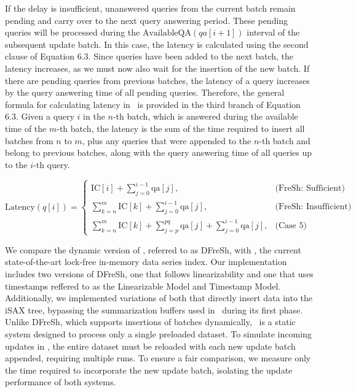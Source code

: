 If the delay is insufficient, unanswered queries from the current batch remain
pending and carry over to the next query answering period. These pending queries
will be processed during the $\text{AvailableQA}(qa[i+1])$ interval of the subsequent
update batch. In this case, the latency is calculated using the second clause of
Equation 6.3. Since queries have been added to the next batch, the latency increases,
as we must now also wait for the insertion of the new batch. 
% 
If there are pending queries from previous batches, the latency of a query increases by
the query answering time of all pending queries. Therefore, the general formula for
calculating latency in \Fresh\ is provided in the third branch of Equation 6.3.
Given a query $i$ in the $n$-th batch, which is answered during the available time of
the $m$-th batch, the latency is the sum of the time required to insert all batches from
$n$ to $m$, plus any queries that were appended to the $n$-th batch and belong to previous
batches, along with the query answering time of all queries up to the $i$-th query.

\begin{equation}
\text{Latency}(q[i]) =
\begin{cases}
    \text{IC}[i] + \sum_{j=0}^{i-1} \text{qa}[j], & \text{(FreSh: Sufficient)} \\[10pt]
    \sum_{k=n}^{m} \text{IC}[k] + \sum_{j=0}^{i-1} \text{qa}[j], & \text{(FreSh: Insufficient)} \\[10pt]
    \sum_{k=n}^{m} \text{IC}[k] + \sum_{j=p}^{pq} \text{qa}[j] + \sum_{j=0}^{i-1} \text{qa}[j], & \text{(Case 5)}
\end{cases}
\end{equation}
\begin{center}
\end{center} 




We compare the dynamic version of \Fresh, referred to as DFreSh, with \Fresh, 
the current state-of-the-art lock-free in-memory data series index. Our implementation 
includes two versions of DFreSh, one that follows linearizability and one that uses
timestamps reffered to as the Linearizable Model and Timestamp Model. Additionally, we implemented variations of both that directly 
insert data into the iSAX tree, bypassing the summarization buffers used in 
\Fresh\ during its first phase.
Unlike DFreSh, which supports insertions of batches dynamically, \Fresh\ is a static
system designed to process only a single preloaded dataset. To simulate incoming updates
in \Fresh, the entire dataset must be reloaded with each new update batch appended, requiring 
multiple runs. To ensure a fair comparison, we measure only the time required to 
incorporate the new update batch, isolating the update performance of both systems.

